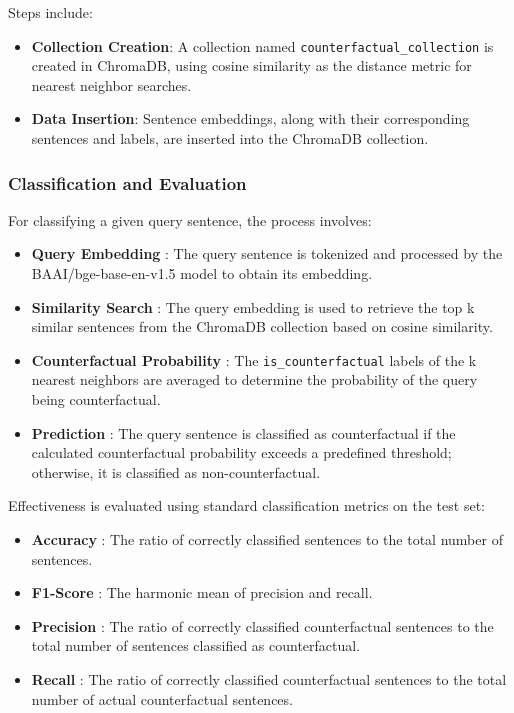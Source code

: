 \documentclass[conference]{IEEEtran}
\begin{document}
Steps include: 

\begin{itemize}
    \item \textbf{Collection Creation}: A collection named \texttt{counterfactual\_collection} is created in ChromaDB, using cosine similarity as the distance metric for nearest neighbor searches. 

    \item \textbf{Data Insertion}: Sentence embeddings, along with their corresponding sentences and labels, are inserted into the ChromaDB collection.
\end{itemize}

\subsubsection{Classification and Evaluation}
For classifying a given query sentence, the process involves:

\begin{itemize}
    \item \textbf{Query Embedding} : The query sentence is tokenized and processed by the BAAI/bge-base-en-v1.5 model to obtain its embedding.
    \item \textbf{Similarity Search} : The query embedding is used to retrieve the top k similar sentences from the ChromaDB collection based on cosine similarity.
    \item \textbf{Counterfactual Probability} :  The \texttt{is\_counterfactual} labels of the k nearest neighbors are averaged to determine the probability of the query being counterfactual.
    \item \textbf{Prediction} : The query sentence is classified as counterfactual if the calculated counterfactual probability exceeds a predefined threshold; otherwise, it is classified as non-counterfactual.
\end{itemize}
Effectiveness is evaluated using standard classification metrics on the test set:
\begin{itemize}
    \item \textbf{Accuracy} : The ratio of correctly classified sentences to the total number of sentences.
    \item \textbf{F1-Score} : The harmonic mean of precision and recall.
    \item \textbf{Precision} : The ratio of correctly classified counterfactual sentences to the total number of sentences classified as counterfactual.
    \item \textbf{Recall} : The ratio of correctly classified counterfactual sentences to the total number of actual counterfactual sentences.
\end{itemize}
\end{document}
